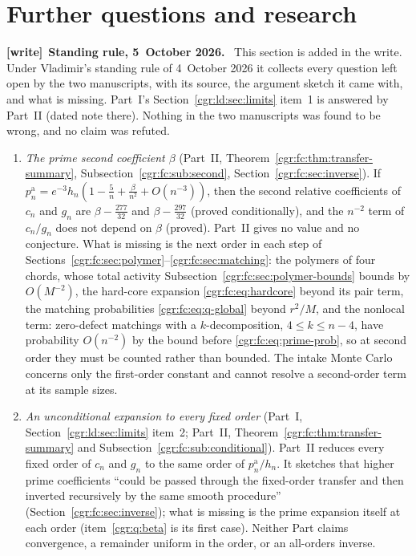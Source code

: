 \documentclass[11pt,letterpaper]{article}
\numberwithin{equation}{section}
\theoremstyle{definition}\newtheorem{definition}[theorem]{Definition}
\theoremstyle{remark}\newtheorem{remark}[theorem]{Remark}
\newenvironment{writenote}[1][]{\par\smallskip\begingroup\small
 \noindent\textbf{[write]}\if\relax\detokenize{#1}\relax\else~\textbf{#1.}\fi\ }%
 {\par\endgroup\smallskip}
\begin{document}
\section{Further questions and research}\label{cgr:sec:further}
\begin{writenote}[Standing rule, 5~October 2026]
This section is added in the write. Under Vladimir's standing rule of 4~October 2026 it collects every question left open by the two manuscripts, with its source, the argument sketch it came with, and what is missing. Part~I's Section~\ref{cgr:ld:sec:limits} item~1 is answered by Part~II (dated note there). Nothing in the two manuscripts was found to be wrong, and no claim was refuted.
\end{writenote}
\begin{enumerate}
\item\label{cgr:q:beta} \emph{The prime second coefficient $\beta$} (Part~II, Theorem~\ref{cgr:fc:thm:transfer-summary}, Subsection~\ref{cgr:fc:sub:second}, Section~\ref{cgr:fc:sec:inverse}). If $p_n^{\mathrm a}=e^{-3}h_n(1-\frac5n+\frac\beta{n^2}+O(n^{-3}))$, then the second relative coefficients of $c_n$ and $g_n$ are $\beta-\frac{277}{32}$ and $\beta-\frac{297}{32}$ (proved conditionally), and the $n^{-2}$ term of $c_n/g_n$ does not depend on $\beta$ (proved). Part~II gives no value and no conjecture. What is missing is the next order in each step of Sections~\ref{cgr:fc:sec:polymer}--\ref{cgr:fc:sec:matching}: the polymers of four chords, whose total activity Subsection~\ref{cgr:fc:sec:polymer-bounds} bounds by $O(M^{-2})$, the hard-core expansion \eqref{cgr:fc:eq:hardcore} beyond its pair term, the matching probabilities \eqref{cgr:fc:eq:q-global} beyond $r^2/M$, and the nonlocal term: zero-defect matchings with a $k$-decomposition, $4\le k\le n-4$, have probability $O(n^{-2})$ by the bound before \eqref{cgr:fc:eq:prime-prob}, so at second order they must be counted rather than bounded. The intake Monte Carlo concerns only the first-order constant and cannot resolve a second-order term at its sample sizes.
\item\label{cgr:q:allorders} \emph{An unconditional expansion to every fixed order} (Part~I, Section~\ref{cgr:ld:sec:limits} item~2; Part~II, Theorem~\ref{cgr:fc:thm:transfer-summary} and Subsection~\ref{cgr:fc:sub:conditional}). Part~II reduces every fixed order of $c_n$ and $g_n$ to the same order of $p_n^{\mathrm a}/h_n$. It sketches that higher prime coefficients ``could be passed through the fixed-order transfer and then inverted recursively by the same smooth procedure'' (Section~\ref{cgr:fc:sec:inverse}); what is missing is the prime expansion itself at each order (item~\ref{cgr:q:beta} is its first case). Neither Part claims convergence, a remainder uniform in the order, or an all-orders inverse.

\end{enumerate}
\end{document}
